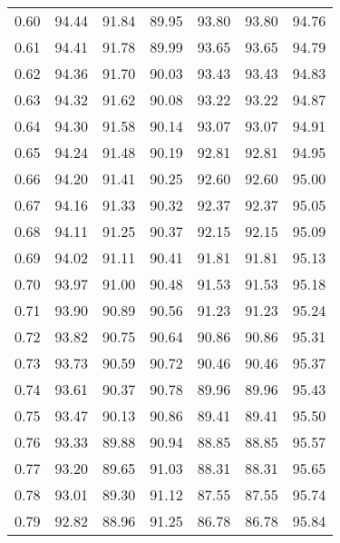 \begin{tabular}{|c|c|c|c|c|c|c|}
      0.60 &     94.44 &     91.84 &      89.95 &   93.80 &      93.80 &         94.76 \\
      0.61 &     94.41 &     91.78 &      89.99 &   93.65 &      93.65 &         94.79 \\
      0.62 &     94.36 &     91.70 &      90.03 &   93.43 &      93.43 &         94.83 \\
      0.63 &     94.32 &     91.62 &      90.08 &   93.22 &      93.22 &         94.87 \\
      0.64 &     94.30 &     91.58 &      90.14 &   93.07 &      93.07 &         94.91 \\
      0.65 &     94.24 &     91.48 &      90.19 &   92.81 &      92.81 &         94.95 \\
      0.66 &     94.20 &     91.41 &      90.25 &   92.60 &      92.60 &         95.00 \\
      0.67 &     94.16 &     91.33 &      90.32 &   92.37 &      92.37 &         95.05 \\
      0.68 &     94.11 &     91.25 &      90.37 &   92.15 &      92.15 &         95.09 \\
      0.69 &     94.02 &     91.11 &      90.41 &   91.81 &      91.81 &         95.13 \\
      0.70 &     93.97 &     91.00 &      90.48 &   91.53 &      91.53 &         95.18 \\
      0.71 &     93.90 &     90.89 &      90.56 &   91.23 &      91.23 &         95.24 \\
      0.72 &     93.82 &     90.75 &      90.64 &   90.86 &      90.86 &         95.31 \\
      0.73 &     93.73 &     90.59 &      90.72 &   90.46 &      90.46 &         95.37 \\
      0.74 &     93.61 &     90.37 &      90.78 &   89.96 &      89.96 &         95.43 \\
      0.75 &     93.47 &     90.13 &      90.86 &   89.41 &      89.41 &         95.50 \\
      0.76 &     93.33 &     89.88 &      90.94 &   88.85 &      88.85 &         95.57 \\
      0.77 &     93.20 &     89.65 &      91.03 &   88.31 &      88.31 &         95.65 \\
      0.78 &     93.01 &     89.30 &      91.12 &   87.55 &      87.55 &         95.74 \\
      0.79 &     92.82 &     88.96 &      91.25 &   86.78 &      86.78 &         95.84 \\

\end{tabular}

